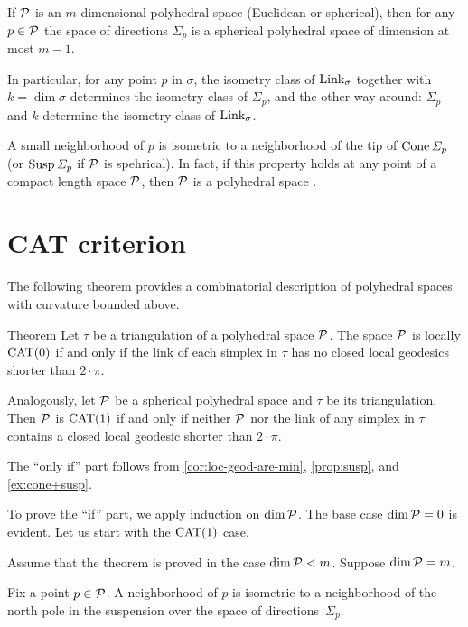 If $\mathcal{P}$ is an $m$-dimensional polyhedral space (Euclidean or spherical),
then for any $p\in \mathcal{P}$
the space of directions $\Sigma_p$ is a spherical polyhedral space
of dimension at most $m-1$. 

In particular, 
for any point $p$ in $\sigma$,
the isometry class of $\mathop{\rm Link}\nolimits_\sigma$ together with $k=\dim\sigma$
determines the isometry class of $\Sigma_p$, 
 and the other way around: $\Sigma_p$ and $k$ determine the isometry class of $\mathop{\rm Link}\nolimits_\sigma$.

A small neighborhood of $p$ is isometric to a neighborhood of the tip of $\mathop{\rm Cone}\nolimits\varSigma_p$ (or $\mathop{\rm Susp}\nolimits \varSigma_p$ if $\mathcal{P}$ is spehrical).
In fact, if this property holds at any point of a compact length space $\mathcal{P}$,
then $\mathcal{P}$ is a polyhedral space \cite{lebedeva-petrunin}.

\section{CAT criterion}

The following theorem provides a combinatorial description of polyhedral spaces with curvature bounded above.


\begin{thm}{Theorem}\label{thm:PL-CAT}
Let $\tau$ be a triangulation of a polyhedral space $\mathcal{P}$. 
The space $\mathcal{P}$ is locally $\mathrm{CAT}(0)$ if and only if the link of each simplex in $\tau$ has no closed local geodesics shorter than $2\cdot\pi$.

Analogously, let $\mathcal{P}$ be a spherical polyhedral space and $\tau$ be its triangulation. 
Then $\mathcal{P}$ is $\mathrm{CAT}(1)$ if and only if neither $\mathcal{P}$ nor the link of any simplex in $\tau$ contains a closed local geodesic shorter than $2\cdot\pi$.
\end{thm}





The ``only if'' part follows from \ref{cor:loc-geod-are-min}, \ref{prop:susp}, and \ref{ex:cone+susp}.

To prove the ``if'' part,
we apply induction on $\operatorname{\rm dim}\nolimits\mathcal{P}$.
The base case $\operatorname{\rm dim}\nolimits\mathcal{P}=0$ is evident.
Let us start with the $\mathrm{CAT}(1)$ case.

Assume that the theorem is proved in the case $\operatorname{\rm dim}\nolimits\mathcal{P}<m$.
Suppose $\operatorname{\rm dim}\nolimits\mathcal{P}=m$.


Fix a point $p\in\mathcal{P}$.
A neighborhood of $p$ 
is isometric to a neighborhood of the north pole in the suspension over the space of directions~$\Sigma_p$.

